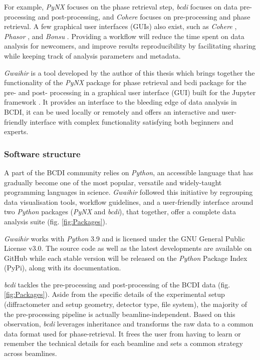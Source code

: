 For example, \textit{PyNX} \parencite{pynx2020operators} focuses on the phase retrieval step, \textit{bcdi} \parencite{jerome_carnis_2021_5741935} focuses on data pre-processing and post-processing, and \textit{Cohere} \parencite{cohere_2021} focuses on pre-processing and phase retrieval.
A few graphical user interfaces (GUIs) also exist, such as \textit{Cohere} \parencite{cohere_2021}, \textit{Phasor} \parencite{dzhigaev_dzhigaevdphasor_2021}, and \textit{Bonsu} \parencite{newton_bonsu_2012}.
Providing a workflow will reduce the time spent on data analysis for newcomers, and improve results reproducibility by facilitating sharing while keeping track of analysis parameters and metadata.

\textit{Gwaihir} is a tool developed by the author of this thesis which brings together the functionality of the \textit{PyNX} package for phase retrieval and bcdi package for the pre- and post- processing in a graphical user interface (GUI) built for the Jupyter framework \parencite{Kluyver2016jupyter}.
It provides an interface to the bleeding edge of data analysis in BCDI, it can be used locally or remotely and offers an interactive and user-friendly interface with complex functionality satisfying both beginners and experts.

\subsubsection{Software structure}

A part of the BCDI community relies on \textit{Python}, an accessible language that has gradually become one of the most popular, versatile \parencite{IPython, Newville2016} and widely-taught \parencite{Scopatz2015, McKinney2017, Boulle2019} programming languages in science.
\textit{Gwaihir} followed this initiative by regrouping data visualisation tools, workflow guidelines, and a user-friendly interface around two \textit{Python} packages (\textit{PyNX} and \textit{bcdi}), that together, offer a complete data analysis suite (fig. \ref{fig:Packages}).

\textit{Gwaihir} works with \textit{Python} 3.9 and is licensed under the GNU General Public License v3.0.
The source code as well as the latest developments are available on GitHub while each stable version will be released on the \textit{Python} Package Index (PyPi), along with its documentation.

\textit{bcdi} \parencite{jerome_carnis_2021_5741935} tackles the pre-processing and post-processing of the BCDI data (fig. \ref{fig:Packages}).
Aside from the specific details of the experimental setup (diffractometer and setup geometry, detector type, file system), the majority of the pre-processing pipeline is actually beamline-independent.
Based on this observation, \textit{bcdi} leverages inheritance and transforms the raw data to a common data format used for phase-retrieval.
It frees the user from having to learn or remember the technical details for each beamline and sets a common strategy across beamlines.

